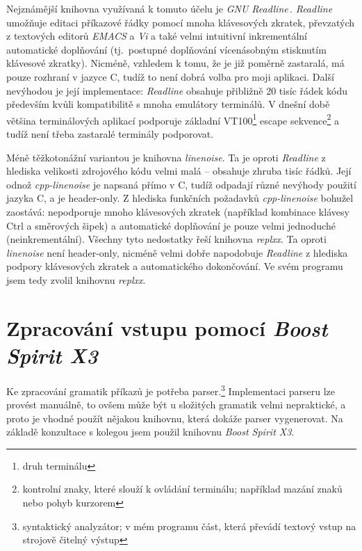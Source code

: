 \documentclass[thesis=B,czech,hidelinks]{FITthesis}[2019/03/06]
\newcommand{\Rplus}{\protect\hspace{-.1em}\protect\raisebox{.35ex}{\smaller{\smaller\textbf{+}}}}
\newcommand{\Cpp}{\mbox{C\Rplus\Rplus}\xspace}
\begin{document}
Nejznámější knihovna využívaná k tomuto účelu je \textit{GNU Readline}\,\cite{readline}. \textit{Readline} umožňuje editaci příkazové řádky pomocí mnoha klávesových zkratek, převzatých z textových editorů \textit{EMACS} a \textit{Vi} a také velmi intuitivní inkrementální automatické doplňování (tj.\ postupné doplňování vícenásobným stisknutím klávesové zkratky). Nicméně, vzhledem k tomu, že je již poměrně zastaralá, má pouze rozhraní v jazyce C, tudíž to není dobrá volba pro moji aplikaci. Další nevýhodou je její implementace: \textit{Readline} obsahuje přibližně 20 tisíc řádek kódu především kvůli kompatibilitě s mnoha emulátory terminálů. V dnešní době většina terminálových aplikací podporuje základní VT100\footnote{druh terminálu} escape sekvence\footnote{kontrolní znaky, které slouží k ovládání terminálu; například mazání znaků nebo pohyb kurzorem} a tudíž není třeba zastaralé terminály podporovat.\cite{linenoise-readme}

Méně těžkotonážní variantou je knihovna \textit{linenoise}. Ta je oproti \textit{Readline} z hlediska velikosti zdrojového kódu velmi malá -- obsahuje zhruba tisíc řádků. Její odnož \textit{cpp-linenoise} je napsaná přímo v \Cpp{}, tudíž odpadají různé nevýhody použití jazyka C, a je header-only. Z hlediska funkčních požadavků \textit{cpp-linenoise} bohužel zaostává: nepodporuje mnoho klávesových zkratek (například kombinace klávesy Ctrl a směrových šipek) a automatické doplňování je pouze velmi jednoduché (neinkrementální). Všechny tyto nedostatky řeší knihovna \textit{replxx}. Ta oproti \textit{linenoise} není header-only, nicméně velmi dobře napodobuje \textit{Readline} z hlediska podpory klávesových zkratek a automatického dokončování. Ve svém programu jsem tedy zvolil knihovnu \textit{replxx}.


\section{Zpracování vstupu pomocí \textit{Boost Spirit X3}}
Ke zpracování gramatik příkazů je potřeba parser.\footnote{syntaktický analyzátor; v mém programu část, která převádí textový vstup na strojově čitelný výstup} Implementaci parseru lze provést manuálně, to ovšem může být u složitých gramatik velmi nepraktické, a proto je vhodné použít nějakou knihovnu, která dokáže parser vygenerovat. Na základě konzultace s kolegou jsem použil knihovnu \textit{Boost Spirit X3}.
\end{document}
